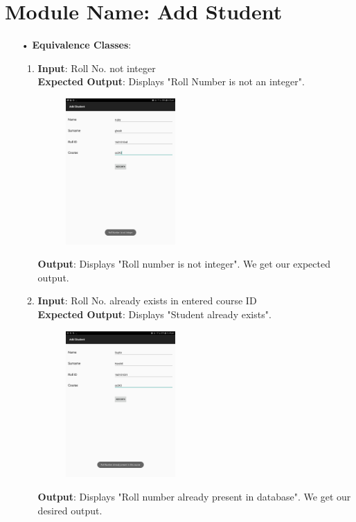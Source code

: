 \documentclass{scrreprt}
\begin{document}
\section{Module Name: Add Student}
\begin{itemize}
\item[•]\textbf{Equivalence Classes}:
\begin{enumerate}
\item \textbf{Input}: Roll No. not integer \\
\textbf{Expected Output}: Displays "Roll Number is not an integer".
\begin{figure}[H]
\centering
\includegraphics[width=0.42\textwidth, keepaspectratio]{addnotint.jpg}
\end{figure}
\textbf{Output}: Displays "Roll number is not integer". We get our expected output.


\item \textbf{Input}:  Roll No. already exists in entered course ID\\
\textbf{Expected Output}: Displays "Student already exists".
\begin{figure}[H]
\centering
\includegraphics[width=0.42\textwidth, keepaspectratio]{addpresent.jpg}
\end{figure}
\textbf{Output}: Displays "Roll number already present in database". We get our desired output.


\end{enumerate}
\end{itemize}
\end{document}
